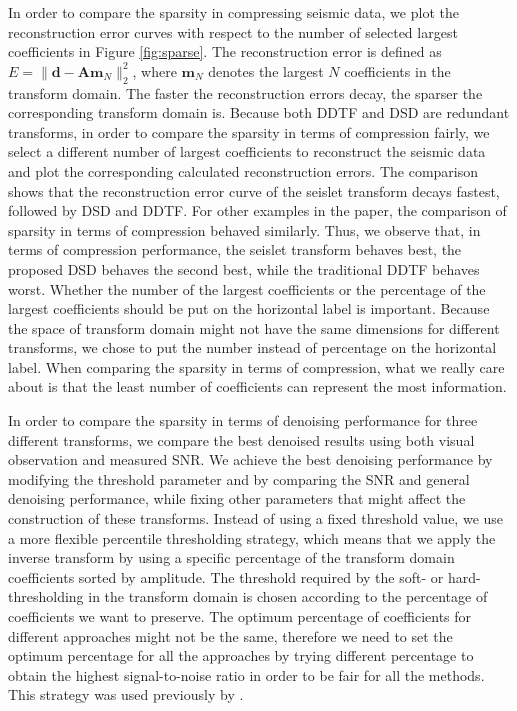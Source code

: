 In order to compare the sparsity in compressing seismic data, we plot the reconstruction error curves with respect to the number of selected largest coefficients in Figure \ref{fig:sparse}. The reconstruction error is defined as $E=\parallel\mathbf{d}-\mathbf{Am}_N\parallel_2^2$, where $\mathbf{m}_N$ denotes the largest $N$ coefficients in the transform domain. The faster the reconstruction errors decay, the sparser the corresponding transform domain is. Because both DDTF and DSD are redundant transforms, in order to compare the sparsity in terms of compression fairly, we select a different number of largest coefficients to reconstruct the seismic data and plot the corresponding calculated reconstruction errors. The comparison shows that the reconstruction error curve of the seislet transform decays fastest, followed by DSD and DDTF. For other examples in the paper, the comparison of sparsity in terms of compression behaved similarly.  Thus, we observe that, in terms of compression performance, the seislet transform behaves best, the proposed DSD behaves the second best, while the traditional DDTF behaves worst. Whether the number of the largest coefficients or the percentage of the largest coefficients should be put on the horizontal label is important. Because the space of transform domain might not have the same dimensions for different transforms, we chose to put the number instead of percentage on the horizontal label. When comparing the sparsity in terms of compression, what we really care about is that the least number of coefficients can represent the most information.

In order to compare the sparsity in terms of denoising performance for three different transforms, we compare the best denoised results using both visual observation and measured SNR. We achieve the best denoising performance by modifying the threshold parameter and by comparing the SNR and general denoising performance, while fixing other parameters that might affect the construction of these transforms. Instead of using a fixed threshold value, we use a more flexible percentile thresholding strategy, which means that we apply the inverse transform by using a specific percentage of the  transform domain coefficients sorted by amplitude. The threshold required by the soft- or hard-thresholding in the transform domain is chosen according to the percentage of coefficients we want to preserve. The optimum percentage of coefficients for different approaches might not be the same, therefore we need to set the optimum percentage for all the approaches by trying different percentage to obtain the highest signal-to-noise ratio in order to be fair for all the methods. This strategy was used previously by \cite{yangkang20142}.

